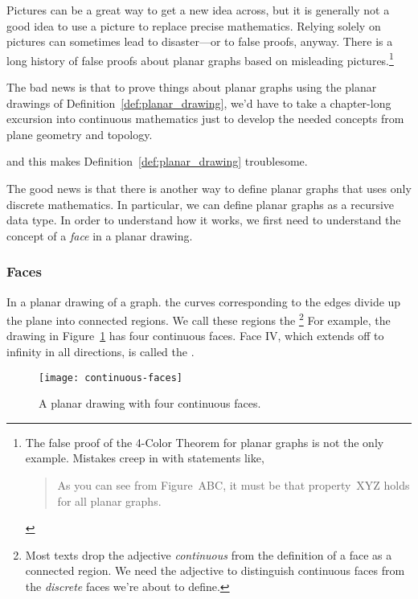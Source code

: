 Pictures can be a great way to get a new idea across, but it is generally
not a good idea to use a picture to replace precise mathematics.  Relying
solely on pictures can sometimes lead to disaster---or to false proofs,
anyway.  There is a long history of false proofs about planar graphs based
on misleading pictures.\footnote{The false proof of the
  4-Color Theorem for planar graphs is not the only example.  Mistakes
  creep in with statements like,
\begin{quote}
    As you can see from Figure~ABC, it must be that property~XYZ holds
    for all planar graphs.
\end{quote}}

The bad news is that to prove things about planar graphs using the planar
drawings of Definition~\ref{def:planar_drawing}, we'd have to take a chapter-long
excursion into continuous mathematics just to develop the needed concepts
from plane geometry and topology.
\begin{editingnotes} and this makes
  Definition~\ref{def:planar_drawing} troublesome.
\end{editingnotes}
The good news is that there is another way to define planar graphs that
uses only discrete mathematics.  In particular, we can define planar
graphs as a recursive data type.  In order to understand how it works, we
first need to understand the concept of a \emph{face} in a planar drawing.

\subsubsection{Faces}

In a planar drawing of a graph. the curves corresponding to the edges
divide up the plane into connected regions.  We call these regions the
\footnote{Most texts drop the adjective
  \emph{continuous} from the definition of a face as a connected region.
  We need the adjective to distinguish continuous faces from the
  \emph{discrete} faces we're about to define.}  For example, the drawing
in Figure~\ref{fig:continuous-faces} has four continuous faces.  Face IV,
which extends off to infinity in all directions, is called the
.

\begin{figure}\redrawn


\texttt{[image: continuous-faces]}

\caption{A planar drawing with four continuous faces.}
\label{fig:continuous-faces}
\end{figure}

